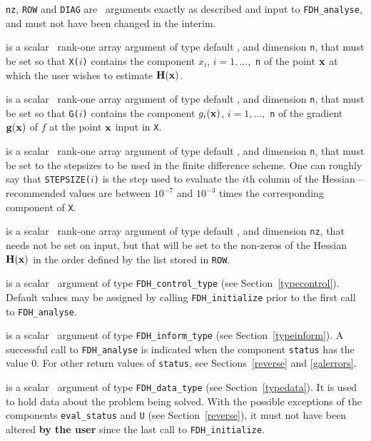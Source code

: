 \documentclass{galahad}
\newcommand{\packagename}{FDH}
\begin{document}
\vspace*{-2mm}
\begin{description}
 {\tt nz}, {\tt ROW} and {\tt DIAG} are  \intentin\ arguments
exactly as described and input to {\tt \packagename\_analyse},
and must not have been changed in the interim.

 is a scalar \intentin\ rank-one array argument of type
default \realdp, and dimension {\tt n}, that  must be set so that
{\tt X(}$i${\tt)} contains the component $x_i$, $i = 1, \ldots,$ {\tt n}
of the point ${\mathbf{x}}$ at which the user wishes to estimate ${\mathbf{H}}({\mathbf{x}})$.

 is a scalar \intentin\ rank-one array argument of type
default \realdp, and dimension {\tt n}, that must be set so that
{\tt G(}$i${\tt)} contains the component $g_i({\mathbf{x}})$, $i = 1, \ldots,$ {\tt n}
of the gradient ${\mathbf{g}}({\mathbf{x}})$ of $f$ at the point ${\mathbf{x}}$ input in {\tt X}.

 is a scalar \intentin\ rank-one array argument of type
default \realdp, and dimension {\tt n}, that must be set to the stepsizes
to be used in the finite difference scheme.  One can roughly say that
{\tt STEPSIZE(}$i${\tt)} is the step used to evaluate the $i$th column
of the Hessian---recommended values are between $10^{-7}$ and $10^{-3}$
times the corresponding  component of {\tt X}.

 is a scalar \intentinout\ rank-one array argument of type
default \realdp, and dimension {\tt nz}, that needs not be set on input,
but that will be set to the non-zeros of the Hessian ${\mathbf{H}}({\mathbf{x}})$ in the
order defined by the list stored in {\tt ROW}.

 is a scalar \intentin\ argument of type
{\tt \packagename\_control\_type}
(see Section~\ref{typecontrol}). Default values may be assigned by calling
{\tt \packagename\_initialize} prior to the first call to
{\tt \packagename\_analyse}.

 is a scalar \intentinout\ argument of type
{\tt \packagename\_inform\_type}
(see Section~\ref{typeinform}).
A successful call to
{\tt \packagename\_analyse}
is indicated when the  component {\tt status} has the value 0.
For other return values of {\tt status}, see Sections~\ref{reverse} and
\ref{galerrors}.

 is a scalar \intentinout\ argument of type
{\tt \packagename\_data\_type}
(see Section~\ref{typedata}). It is used to hold data about the problem being
solved. With the possible exceptions of the components
{\tt eval\_status} and {\tt U} (see Section~\ref{reverse}),
it must not have been altered {\bf by the user} since the last call to
{\tt \packagename\_initialize}.


\end{description}
\end{document}
